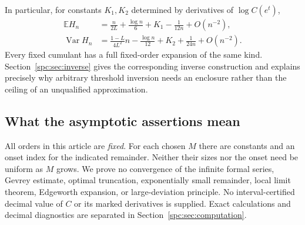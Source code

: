 \documentclass[11pt,letterpaper]{article}
\theoremstyle{definition}\newtheorem{definition}[theorem]{Definition}
\theoremstyle{remark}\newtheorem{remark}[theorem]{Remark}
\newcommand{\E}{\mathbb E}
\newcommand{\Var}{\operatorname{Var}}
\begin{document}
In particular, for constants $K_1,K_2$ determined by derivatives of $\log C(e^t)$,
\begin{align}
 \E H_n&=\frac{n}{2L}+\frac{\log n}{6}+K_1-\frac1{12n}+O(n^{-2}),\label{spc:eq:meanintro}\\
 \Var H_n&=\frac{1-L}{4L^2}n-\frac{\log n}{12}+K_2+\frac1{24n}+O(n^{-2}).\label{spc:eq:varintro}
\end{align}
Every fixed cumulant has a full fixed-order expansion of the same kind. Section~\ref{spc:sec:inverse} gives the corresponding inverse construction and explains precisely why arbitrary threshold inversion needs an enclosure rather than the ceiling of an unqualified approximation.

\subsection{What the asymptotic assertions mean}\label{spc:sec:meaning}
All orders in this article are \emph{fixed}. For each chosen $M$ there are constants and an onset index for the indicated remainder. Neither their sizes nor the onset need be uniform as $M$ grows. We prove no convergence of the infinite formal series, Gevrey estimate, optimal truncation, exponentially small remainder, local limit theorem, Edgeworth expansion, or large-deviation principle. No interval-certified decimal value of $C$ or its marked derivatives is supplied. Exact calculations and decimal diagnostics are separated in Section~\ref{spc:sec:computation}.
\end{document}

